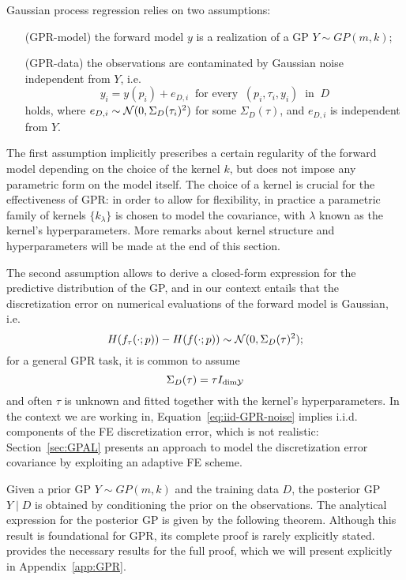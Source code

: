 Gaussian process regression relies on two assumptions:
\begin{itemize}[font=\itshape, leftmargin=1.5cm, align=right, labelwidth=2.4cm]
    \item[(GPR-model)] the forward model $y$ is a realization of a GP $Y \sim GP(m, k)$;
    \item[(GPR-data)] the observations are contaminated by Gaussian noise independent from $Y$, i.e. 
    \[ 
        y_i = y(p_i) + e_{D,i} \ \text{ for every } \ (p_i,\tau_i,y_i) \ \text{ in } \ D 
    \] 
    holds, where $e_{D,i} \sim \mathcal N(0, \Sigma_D(\tau_i)^2)$ for some $\Sigma_D(\tau)$, and $e_{D,i}$ is independent from $Y$.
\end{itemize}  
The first assumption implicitly prescribes a certain regularity of the forward model depending on the choice of the kernel $k$, but does not impose any parametric form on the model itself. 
The choice of a kernel is crucial for the effectiveness of GPR: in order to allow for flexibility, in practice a parametric family of kernels $\{ k_\lambda\}$ is chosen to model the covariance, with $\lambda$ known as the kernel's hyperparameters. More remarks about kernel structure and hyperparameters will be made at the end of this section.

The second assumption allows to derive a closed-form expression for the predictive distribution of the GP, and in our context entails that the discretization error on numerical evaluations of the forward model is Gaussian, i.e. 
\[
    H(f_{\tau}(\cdot; p)) - H(f(\cdot; p)) \sim \mathcal N(0, \Sigma_D(\tau)^2);
\] for a general GPR task, it is common to assume 
\begin{equation}\label{eq:iid-GPR-noise}
    \Sigma_D(\tau) = \tau I_{\text{dim} \mathcal Y}
\end{equation} 
and often $\tau$ is unknown and fitted together with the kernel's hyperparameters. \newline
In the context we are working in, Equation~\eqref{eq:iid-GPR-noise} implies i.i.d. components of the FE discretization error, which is not realistic: Section~\ref{sec:GPAL} presents an approach to model the discretization error covariance by exploiting an adaptive FE scheme. \medbreak

Given a prior GP $Y \sim GP(m, k)$ and the training data $D$, the posterior GP $Y \mid D$ is obtained by conditioning the prior on the observations. 
The analytical expression for the posterior GP is given by the following theorem.
Although this result is foundational for GPR, its complete proof is rarely explicitly stated.~\cite[Appendix A]{RasmussenWilliams2006} provides the necessary results for the full proof, which we will present explicitly in Appendix~\ref{app:GPR}.

